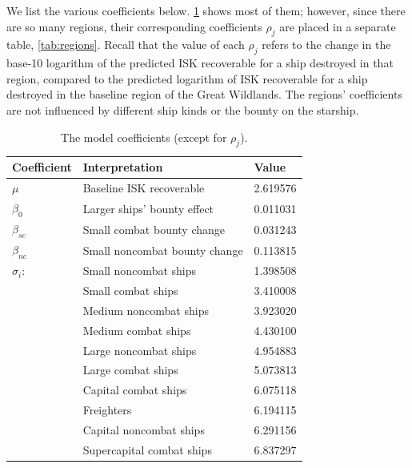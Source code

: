 \documentclass[letterpaper,12pt,article]{memoir}
\begin{document}
We list the various coefficients below. \cref{tab:coeffs} shows most of them;
however, since there are so many regions, their corresponding coefficients 
$\rho_j$ are placed in a separate table, \cref{tab:regions}. Recall that the
value of each $\rho_j$ refers to the change in the base-10 logarithm of the
predicted ISK recoverable for a ship destroyed in that region, compared to
the predicted logarithm of ISK recoverable for a ship destroyed in the 
baseline region of the Great Wildlands. The regions' coefficients are not
influenced by different ship kinds or the bounty on the starship.

\begin{table}[ht]
    \centering
    \begin{tabular}{@{}lll@{}}
        \toprule
        Coefficient & Interpretation & Value \\
        \midrule
        $\mu$ & Baseline ISK recoverable & 2.619576 \\
        $\beta_0$ & Larger ships' bounty effect & 0.011031 \\
        $\beta_{sc}$ & Small combat bounty change & 0.031243 \\
        $\beta_{nc}$ & Small noncombat bounty change & 0.113815 \\
        \midrule
        $\sigma_i$: & Small noncombat ships & 1.398508 \\
         & Small combat ships & 3.410008 \\
         & Medium noncombat ships & 3.923020 \\
         & Medium combat ships & 4.430100 \\
         & Large noncombat ships & 4.954883 \\
         & Large combat ships & 5.073813 \\
         & Capital combat ships & 6.075118 \\
         & Freighters & 6.194115 \\
         & Capital noncombat ships & 6.291156 \\
         & Supercapital combat ships & 6.837297 \\
        \bottomrule
    \end{tabular}
    \caption{The model coefficients (except for $\rho_j$).}
    \label{tab:coeffs}
\end{table}
\end{document}
